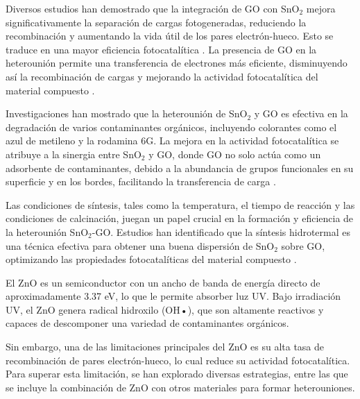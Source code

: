 \documentclass[12pt]{article}
\begin{document}
Diversos estudios han demostrado que la integración de GO con SnO$\displaystyle _{2}$ mejora significativamente la separación de cargas fotogeneradas, reduciendo la recombinación y aumentando la vida útil de los pares electrón-hueco. Esto se traduce en una mayor eficiencia fotocatalítica \cite{IEEEreferencias:SnO2GO_Fotocatalisis_6}. La presencia de GO en la heterounión permite una transferencia de electrones más eficiente, disminuyendo así la recombinación de cargas y mejorando la actividad fotocatalítica del material compuesto \cite{IEEEreferencias:Ref18}.
\vspace{1em} %

Investigaciones han mostrado que la heterounión de SnO$\displaystyle _{2}$ y GO es efectiva en la degradación de varios contaminantes orgánicos, incluyendo colorantes como el azul de metileno y la rodamina 6G. La mejora en la actividad fotocatalítica se atribuye a la sinergia entre SnO$\displaystyle _{2}$ y GO, donde GO no solo actúa como un adsorbente de contaminantes, debido a la abundancia de grupos funcionales en su superficie y en los bordes, facilitando la transferencia de carga \cite{IEEEreferencias:Ref13}.
\vspace{1em} %

Las condiciones de síntesis, tales como la temperatura, el tiempo de reacción y las condiciones de calcinación, juegan un papel crucial en la formación y eficiencia de la heterounión SnO$\displaystyle _{2}$-GO. Estudios han identificado que la síntesis hidrotermal es una técnica efectiva para obtener una buena dispersión de SnO$\displaystyle _{2}$ sobre GO, optimizando las propiedades fotocatalíticas del material compuesto \cite{IEEEreferencias:Ref14}.
\vspace{1em} %

El ZnO es un semiconductor con un ancho de banda de energía directo de aproximadamente 3.37 eV, lo que le permite absorber luz UV. Bajo irradiación UV, el ZnO genera radical hidroxilo (OH•), que son altamente reactivos y capaces de descomponer una variedad de contaminantes orgánicos. 
\vspace{1em} %

Sin embargo, una de las limitaciones principales del ZnO es su alta tasa de recombinación de pares electrón-hueco, lo cual reduce su actividad fotocatalítica. Para superar esta limitación, se han explorado diversas estrategias, entre las que se incluye la combinación de ZnO con otros materiales para formar heterouniones.
\vspace{1em} %
\end{document}
